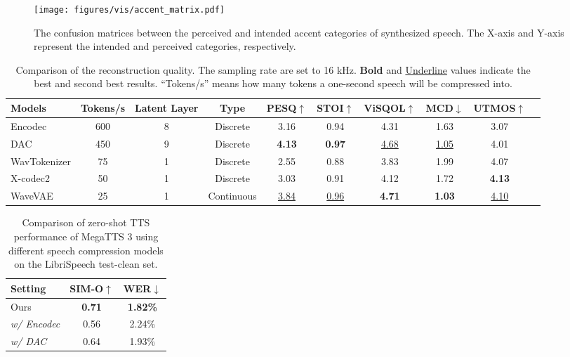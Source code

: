 \begin{figure}[!t]
  \centering
    \texttt{[image: figures/vis/accent\_matrix.pdf]}
  \caption{The confusion matrices between the perceived and intended accent categories of synthesized speech. The X-axis and Y-axis represent the intended and perceived categories, respectively.}
  \label{exp:accent_confusion_matrices}
\end{figure}





\begin{table*}[!ht]
\centering
\small
\begin{tabular}{@{}l|ccccccccc@{}}
\toprule
\textbf{Models} & \textbf{Tokens/s} & \textbf{Latent Layer} & \textbf{Type} & \textbf{PESQ$\uparrow$} & \textbf{STOI$\uparrow$} & \textbf{ViSQOL$\uparrow$} & \textbf{MCD$\downarrow$} & \textbf{UTMOS$\uparrow$} \\
\midrule
Encodec &  600 & 8 & Discrete & 3.16 & 0.94 & 4.31 & 1.63 & 3.07 \\
DAC &  450 & 9 & Discrete & \textbf{4.13} & \textbf{0.97} & \underline{4.68} & \underline{1.05} & 4.01 \\
WavTokenizer &  75 & 1 & Discrete & 2.55 & 0.88 & 3.83 & 1.99 & 4.07 \\
X-codec2 &  50 & 1 & Discrete & 3.03 & 0.91 & 4.12 & 1.72 & \textbf{4.13} \\
\midrule
WaveVAE & 25 & 1 & Continuous & \underline{3.84} & \underline{0.96} & \textbf{4.71} & \textbf{1.03} & \underline{4.10} \\
\bottomrule
\end{tabular}
\caption{Comparison of the reconstruction quality. The sampling rate are set to 16 kHz.  \textbf{Bold} and \underline{Underline} values indicate the best and second best results. ``Tokens/s'' means how many tokens a one-second speech will be compressed into.}
\label{app:table_recon_speech_compression}
\end{table*}

\begin{table}[!ht]
\small
\centering
\begin{tabular}{@{}l|cc@{}}
\toprule
\bfseries Setting & \bfseries SIM-O$\uparrow$ & \bfseries WER$\downarrow$ \\       
\midrule
Ours   & \bfseries 0.71           & \bfseries 1.82\%                 \\
\midrule
\textit{w/ Encodec}  & 0.56           & 2.24\%                 \\
\textit{w/ DAC}  &  0.64 & 1.93\%        \\
\bottomrule
\end{tabular}
\caption{Comparison of zero-shot TTS performance of MegaTTS 3 using different speech compression models on the LibriSpeech test-clean set.}
\label{app:table_zs_tts_different_codec}
\end{table}

